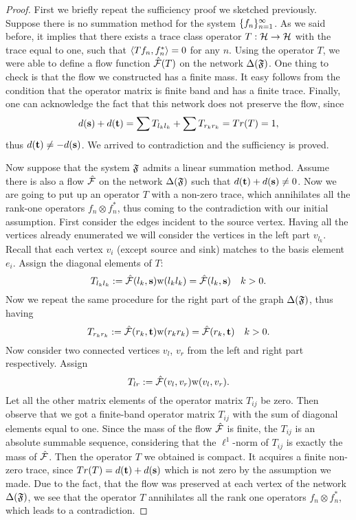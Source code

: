 \documentclass[12pt]{article}
\begin{document}
    \begin{proof}
      First we briefly repeat the sufficiency proof we sketched previously.
      Suppose there is no summation method for the system $\seq{f}$.
      As we said before, it implies that there exists a trace class operator $T : \cal{H} \to \cal{H}$ with
      the trace equal to one, such that $\inner{Tf_n}{f_n^*} = 0$ for any $n$.
      Using the operator $T$, we were able to define a flow function $\flow(T)$ on the network
      $\net(\fsys)$.
      One thing to check is that the flow we constructed has a finite mass.
      It easy follows from the condition that the operator matrix is finite band and has a finite trace.
      Finally, one can acknowledge the fact that this network does not preserve the flow, since
      \[
        d(\source) + d(\sink) = \sum T_{l_k l_k} + \sum T_{r_k r_k} = Tr(T) = 1,
      \]
      thus $d(\sink) \neq -d(\source)$.
      We arrived to contradiction and the sufficiency is proved.

      Now suppose that the system $\fsys$ admits a linear summation method.
      Assume there is also a flow $\flow$ on the network $\net(\fsys)$ such that $d(\sink) + d(\source) \neq 0$.
      Now we are going to put up an operator $T$ with a non-zero trace, which annihilates all the rank-one
      operators $f_n \otimes f^*_n$, thus coming to the contradiction with our initial assumption.
      First consider the edges incident to the source vertex.
      Having all the vertices already enumerated we will consider the vertices in the left part $v_{l_k}$.
      Recall that each vertex $v_i$ (except source and sink) matches to the basis element $e_i$.
      Assign the diagonal elements of $T$:
      \[
        T_{l_k l_k} := \flow(l_k, \source) \wtp(l_k l_k) = \flow(l_k, \source) \quad k > 0.
      \]
      Now we repeat the same procedure for the right part of the graph $\net(\fsys)$, thus having
      \[
        T_{r_k r_k} := \flow(r_k, \sink) \wtp(r_k r_k) = \flow(r_k, \sink) \quad k > 0.
      \]
      Now consider two connected vertices $v_l$, $v_r$ from the left and right part
        respectively. Assign
      \[
        T_{lr} := \flow(v_l, v_r) \wtp(v_l, v_r).
      \]
      Let all the other matrix elements of the operator matrix $T_{ij}$ be zero.
      Then observe that we got a finite-band operator matrix $T_{ij}$ with the sum of diagonal elements
      equal to one.
      Since the mass of the flow $\flow$ is finite, the $T_{ij}$ is an absolute summable sequence, considering that
        the $\ell^1$-norm of $T_{ij}$ is exactly the mass of $\flow$.
      Then the operator $T$ we obtained is compact.
      It acquires a finite non-zero trace, since $Tr(T) = d(\sink) + d(\source)$ which is not zero
        by the assumption we made.
      Due to the fact, that the flow was preserved at each vertex of the network $\net(\fsys)$,
        we see that the operator $T$ annihilates all the rank one operators $f_n \otimes f^*_n$,
        which leads to a contradiction.
    \end{proof}
\end{document}
